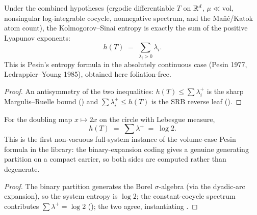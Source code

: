 \begin{theorem}\label{pesin_entropy_formula_spectral}
  \leanok
  Under the combined hypotheses (ergodic differentiable \(T\) on \(\mathbb{R}^d\), \(\mu\ll\mathrm{vol}\),
  nonsingular log-integrable cocycle, nonnegative spectrum, and the Ma\~n\'e/Katok atom count), the
  Kolmogorov--Sinai entropy is exactly the sum of the positive Lyapunov exponents:
  \[
    h(T) \;=\; \sum_{\lambda_i>0}\lambda_i.
  \]
  This is Pesin's entropy formula in the absolutely continuous case (Pesin 1977, Ledrappier--Young
  1985), obtained here foliation-free.
\end{theorem}
\begin{proof}\leanok
  An antisymmetry of the two inequalities: \(h(T)\le\sum\lambda_i^{+}\) is the sharp Margulis--Ruelle
  bound () and \(\sum\lambda_i^{+}\le h(T)\) is the SRB reverse leaf
  ().
\end{proof}

\begin{theorem}\label{pesin_formula_doublingMap}
  \leanok
  For the doubling map \(x\mapsto 2x\) on the circle with Lebesgue measure,
  \[
    h(T) \;=\; \sum\lambda^{+} \;=\; \log 2 .
  \]
  This is the first non-vacuous full-system instance of the volume-case Pesin formula in the
  library: the binary-expansion coding gives a genuine generating partition on a compact carrier,
  so both sides are computed rather than degenerate.
\end{theorem}
\begin{proof}\leanok
  The binary partition generates the Borel \(\sigma\)-algebra (via the dyadic-arc expansion), so the
  system entropy is \(\log 2\); the constant-cocycle spectrum contributes \(\sum\lambda^{+}=\log 2\)
  (); the two agree, instantiating
  .
\end{proof}
